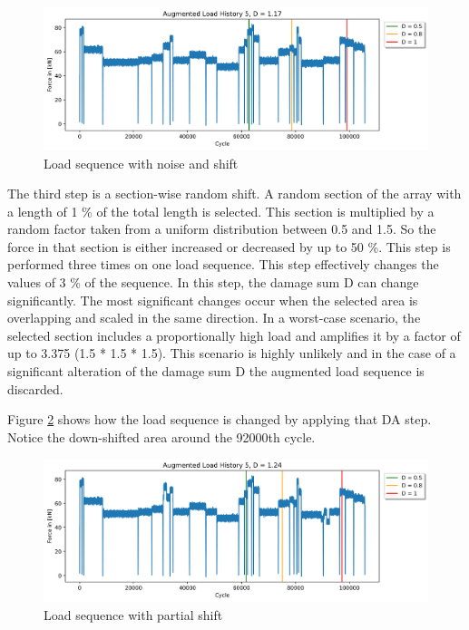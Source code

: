 \begin{figure}[H]
	\centering
	\includegraphics[width=1\linewidth]{IMGs/Verlauf_5_noise.jpg}
	\caption{Load sequence with noise and shift}
	\label{fig:V5_shift}
\end{figure}

The third step is a section-wise random shift. A random section of the array with a length of 1 \% of the total length is selected. This section is multiplied by a random factor taken from a uniform distribution between 0.5 and 1.5. So the force in that section is either increased or decreased by up to 50 \%. This step is performed three times on one load sequence. This step effectively changes the values of 3 \% of the sequence.  
\newpage
In this step, the damage sum D can change significantly. The most significant changes occur when the selected area is overlapping and scaled in the same direction. In a worst-case scenario, the selected section includes a proportionally high load and amplifies it by a factor of up to 3.375 (1.5 * 1.5 * 1.5). This scenario is highly unlikely and in the case of a significant alteration of the damage sum D the augmented load sequence is discarded.
 
Figure \ref{fig:Verlauf_5_shift_partial} shows how the load sequence is changed by applying that DA step. Notice the down-shifted area around the 92000th cycle.


\begin{figure}[H]
	\centering
	\includegraphics[width=1\linewidth]{IMGs/Verlauf_5_shift_partial.jpg}
	\caption{Load sequence with partial shift}
	\label{fig:Verlauf_5_shift_partial}
\end{figure}

